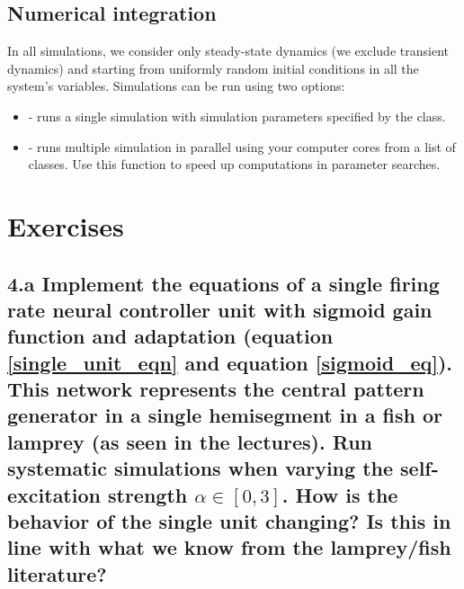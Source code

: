 \documentclass{cmc}
\begin{document}
\subsection*{Numerical integration}
In all simulations, we consider only steady-state dynamics (we exclude transient dynamics) and starting from uniformly random initial conditions in all the system's variables. Simulations can be run using two options:
\begin{itemize}
\item {} - runs a single simulation with simulation parameters specified by the  class.
\item {} - runs multiple simulation in parallel using your computer cores from a list of  classes. Use this function to speed up computations in parameter searches.
\end{itemize}




\section*{Exercises}

\subsection*{4.a Implement the equations of a single firing rate neural controller unit with
 sigmoid gain function and adaptation (equation \ref{single_unit_eqn} and equation \ref{sigmoid_eq}). This network represents the
 central pattern generator in a single hemisegment in a fish or lamprey (as seen in the lectures).
 Run systematic simulations when varying the self-excitation strength $\alpha \in [0,3]$. How is the behavior of the single unit changing? Is this in line with what we know from the lamprey/fish literature?}
\end{document}
